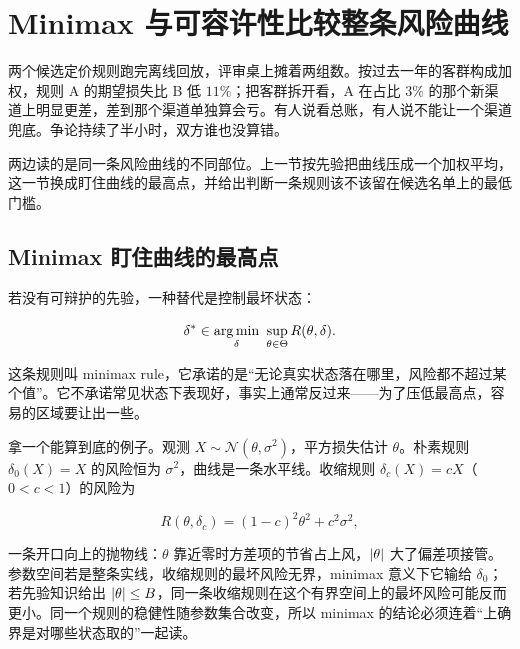 \section{Minimax 与可容许性比较整条风险曲线}
\label{sec:11-Mathematical-Statistics/07-Statistical-Decision-and-Reliable-Prediction/03}

两个候选定价规则跑完离线回放，评审桌上摊着两组数。按过去一年的客群构成加权，规则 A 的期望损失比 B 低 \(11\%\)；把客群拆开看，A 在占比 \(3\%\) 的那个新渠道上明显更差，差到那个渠道单独算会亏。有人说看总账，有人说不能让一个渠道兜底。争论持续了半小时，双方谁也没算错。

两边读的是同一条风险曲线的不同部位。上一节按先验把曲线压成一个加权平均，这一节换成盯住曲线的最高点，并给出判断一条规则该不该留在候选名单上的最低门槛。

\subsection{Minimax 盯住曲线的最高点}

若没有可辩护的先验，一种替代是控制最坏状态：

\[
\delta^\ast\in\argmin_\delta\ \sup_{\theta\in\Theta}R(\theta,\delta).
\]

这条规则叫 minimax rule，它承诺的是``无论真实状态落在哪里，风险都不超过某个值''。它不承诺常见状态下表现好，事实上通常反过来——为了压低最高点，容易的区域要让出一些。

拿一个能算到底的例子。观测 \(X\sim\mathcal N(\theta,\sigma^2)\)，平方损失估计 \(\theta\)。朴素规则 \(\delta_0(X)=X\) 的风险恒为 \(\sigma^2\)，曲线是一条水平线。收缩规则 \(\delta_c(X)=cX\)（\(0<c<1\)）的风险为

\[
R(\theta,\delta_c)=(1-c)^2\theta^2+c^2\sigma^2 ,
\]

一条开口向上的抛物线：\(\theta\) 靠近零时方差项的节省占上风，\(\left|\theta\right|\) 大了偏差项接管。参数空间若是整条实线，收缩规则的最坏风险无界，minimax 意义下它输给 \(\delta_0\)；若先验知识给出 \(\left|\theta\right|\le B\)，同一条收缩规则在这个有界空间上的最坏风险可能反而更小。同一个规则的稳健性随参数集合改变，所以 minimax 的结论必须连着``上确界是对哪些状态取的''一起读。

